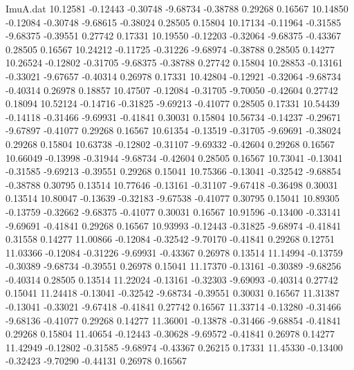 \begin{filecontents}{ImuA.dat}
  10.12581   -0.12443   -0.30748   -9.68734   -0.38788    0.29268    0.16567
  10.14850   -0.12084   -0.30748   -9.68615   -0.38024    0.28505    0.15804
  10.17134   -0.11964   -0.31585   -9.68375   -0.39551    0.27742    0.17331
  10.19550   -0.12203   -0.32064   -9.68375   -0.43367    0.28505    0.16567
  10.24212   -0.11725   -0.31226   -9.68974   -0.38788    0.28505    0.14277
  10.26524   -0.12802   -0.31705   -9.68375   -0.38788    0.27742    0.15804
  10.28853   -0.13161   -0.33021   -9.67657   -0.40314    0.26978    0.17331
  10.42804   -0.12921   -0.32064   -9.68734   -0.40314    0.26978    0.18857
  10.47507   -0.12084   -0.31705   -9.70050   -0.42604    0.27742    0.18094
  10.52124   -0.14716   -0.31825   -9.69213   -0.41077    0.28505    0.17331
  10.54439   -0.14118   -0.31466   -9.69931   -0.41841    0.30031    0.15804
  10.56734   -0.14237   -0.29671   -9.67897   -0.41077    0.29268    0.16567
  10.61354   -0.13519   -0.31705   -9.69691   -0.38024    0.29268    0.15804
  10.63738   -0.12802   -0.31107   -9.69332   -0.42604    0.29268    0.16567
  10.66049   -0.13998   -0.31944   -9.68734   -0.42604    0.28505    0.16567
  10.73041   -0.13041   -0.31585   -9.69213   -0.39551    0.29268    0.15041
  10.75366   -0.13041   -0.32542   -9.68854   -0.38788    0.30795    0.13514
  10.77646   -0.13161   -0.31107   -9.67418   -0.36498    0.30031    0.13514
  10.80047   -0.13639   -0.32183   -9.67538   -0.41077    0.30795    0.15041
  10.89305   -0.13759   -0.32662   -9.68375   -0.41077    0.30031    0.16567
  10.91596   -0.13400   -0.33141   -9.69691   -0.41841    0.29268    0.16567
  10.93993   -0.12443   -0.31825   -9.68974   -0.41841    0.31558    0.14277
  11.00866   -0.12084   -0.32542   -9.70170   -0.41841    0.29268    0.12751
  11.03366   -0.12084   -0.31226   -9.69931   -0.43367    0.26978    0.13514
  11.14994   -0.13759   -0.30389   -9.68734   -0.39551    0.26978    0.15041
  11.17370   -0.13161   -0.30389   -9.68256   -0.40314    0.28505    0.13514
  11.22024   -0.13161   -0.32303   -9.69093   -0.40314    0.27742    0.15041
  11.24418   -0.13041   -0.32542   -9.68734   -0.39551    0.30031    0.16567
  11.31387   -0.13041   -0.33021   -9.67418   -0.41841    0.27742    0.16567
  11.33714   -0.13280   -0.31466   -9.68136   -0.41077    0.29268    0.14277
  11.36001   -0.13878   -0.31466   -9.68854   -0.41841    0.29268    0.15804
  11.40654   -0.12443   -0.30628   -9.69572   -0.41841    0.26978    0.14277
  11.42949   -0.12802   -0.31585   -9.68974   -0.43367    0.26215    0.17331
  11.45330   -0.13400   -0.32423   -9.70290   -0.44131    0.26978    0.16567

\end{filecontents}
